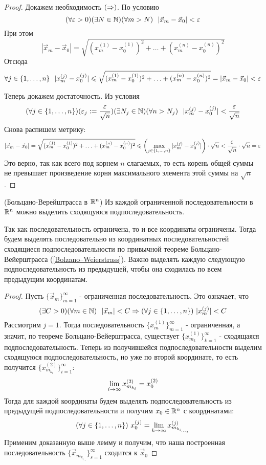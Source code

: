 \begin{proof}
	Докажем необходимость $(\Rightarrow)$. По условию
	\[
		(\forall \varepsilon > 0)(\exists N \in \mathbb{N})
		(\forall m > N)\ \ |\vec{x}_m - \vec{x}_0| < \varepsilon
	\]
	При этом
	\[
		|\vec{x}_m - \vec{x}_0| =
		\sqrt{(x_m^{(1)} - x_0^{(1)})^2 +
		\ldots + (x_m^{(n)} - x_0^{(n)})^2}
	\]
	Отсюда
	\[
		\forall j \in \{1, \ldots, n\}\ \ 
		|x_m^{(j)} - x_0^{(j)}| \le
		\sqrt{(x_m^{(1)} - x_0^{(1)})^2 +
		\ldots + (x_m^{(n)} - x_0^{(n)})^2} =
		|\vec{x}_m - \vec{x}_0| < \eps
	\]
	
	Теперь докажем достаточность. Из условия
	\[
		(\forall j \in \range{n})(\eps_j := \frac{\eps}{\sqrt{n}})
		(\exists N_j \in \N)(\forall n > N_j)\ \ 
		|x_m^{(j)} - x_0^{(j)}| < \frac{\eps}{\sqrt{n}}
	\]
	Снова распишем метрику:
	\[
		|\vec{x}_m - \vec{x}_0| =
		\sqrt{(x_m^{(1)} - x_0^{(1)})^2 + \ldots
		+ (x_m^{(n)} - x_0^{(n)})^2} \leqslant
		\left(\max\limits_{j \in \{1, \ldots, n\}}
		|x_m^{(j)} - x_0^{(j)}|\right) \cdot \sqrt{n} <
		\frac{\varepsilon}{\sqrt{n}} \cdot \sqrt{n} = \varepsilon
	\]
	Это верно, так как всего под корнем $n$ слагаемых, то есть
	корень общей суммы не превышает произведение корня максимального
	элемента этой суммы на $\sqrt{n}$.
\end{proof}

\begin{theorem} (Больцано-Верейштрасса в $\mathbb{R}^n$)
	Из каждой ограниченной последовательности в $\mathbb{R}^n$
	можно выделить сходящуюся подпоследовательность.
\end{theorem}

\begin{idea}
	Так как последовательность ограничена, то и все координаты
	ограничены. Тогда будем выделять последовательно из координатных
	последовательностей сходящиеся подпоследовательности
	по привычной теореме Больцано-Вейерштрасса
	(\ref{Bolzano–Weierstrass}). Важно выделять каждую
	следующую подпоследовательность из предыдущей, чтобы
	она сходилась по всем предыдущим координатам.
\end{idea}

\begin{proof}
	Пусть $\{\vec{x}_m\}_{m = 1}^\infty$ - ограниченная
	последовательность. Это означает, что
	\[
		(\exists C > 0)(\forall m \in \N)\ \ 
		|\vec{x}_m| < C \Ra (\forall j \in \range{n})\ 
		|x_m^{(j)}| < C
	\]
	Рассмотрим $j = 1$.
	Тогда последовательность $\{x_m^{(1)}\}_{m = 1}^\infty$
	- ограниченная, а значит, по теореме
	Больцано-Вейерштрасса, существует
	$\{x_{m_k}^{(1)}\}_{k = 1}^\infty$ -
	сходящаяся подпоследовательность. Теперь из получившейся
	подпоследовательности выделим сходящуюся подпоследовательность,
	но уже по второй координате, то есть получится
	$\{x_{m_{k_i}}^{(2)}\}_{i = 1}^\infty$:
	\[
		\lim\limits_{i \to \infty} x_{m_{k_i}}^{(2)} = x_0^{(2)}
	\]
	Тогда для каждой
	координаты будем выделять подпоследовательность
	из предыдущей подпоследовательности и получим $x_0 \in \mathbb{R}^n$
	с координатами:
	\[
		(\forall j \in \range{n})\ 
		x_0^{(j)} = \liml_{k \to \infty}
		x_{m_{k_{i_{\dots_{s}}}}}^{(j)}
	\]
	Применим доказанную выше лемму и получим, что наша
	построенная последовательность
	$\{\vec{x}_{m_{k_{i_{\dots_{s}}}}}\}_{s = 1}^\infty$
	сходится к $\vec{x}_0$
\end{proof}

